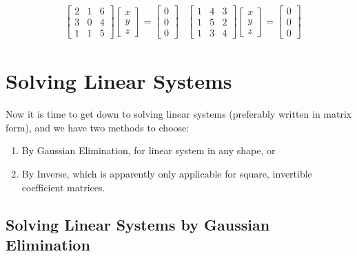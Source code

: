 \begin{align*}
&
\begin{bmatrix}
2 & 1 & 6 \\
3 & 0 & 4 \\
1 & 1 & 5 
\end{bmatrix}
\begin{bmatrix}
x \\
y \\
z
\end{bmatrix}
=
\begin{bmatrix}
0 \\
0 \\
0
\end{bmatrix}
&
\begin{bmatrix}
1 & 4 & 3 \\
1 & 5 & 2 \\
1 & 3 & 4 
\end{bmatrix}
\begin{bmatrix}
x \\
y \\
z
\end{bmatrix}
=
\begin{bmatrix}
0 \\
0 \\
0
\end{bmatrix}
\end{align*}

\section{Solving Linear Systems}
\label{section:SolveLinSys}
Now it is time to get down to solving linear systems (preferably written in matrix form), and we have two methods to choose:
\begin{enumerate}
\item By Gaussian Elimination, for linear system in any shape, or
\item By Inverse, which is apparently only applicable for square, invertible coefficient matrices.
\end{enumerate}

\subsection{Solving Linear Systems by Gaussian Elimination}
\label{subsection:SolLinSysGauss}

